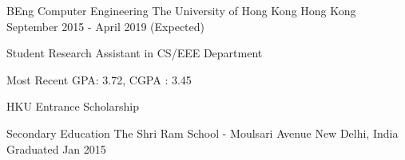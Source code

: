 \begin{cventries}
  \cventry
    {BEng Computer Engineering}
    {The University of Hong Kong}
    {Hong Kong}
    {September 2015 - April 2019 (Expected)}
    {
      \begin{cvitems}
        \item {Student Research Assistant in CS/EEE Department}
        \item{Most Recent GPA: 3.72, CGPA : 3.45}
	\item{HKU Entrance Scholarship}
      \end{cvitems}
    }
    
  \cventry
    {Secondary Education}
    {The Shri Ram School - Moulsari Avenue}
    {New Delhi, India}
    {Graduated Jan 2015}
    {
    }
\end{cventries}
